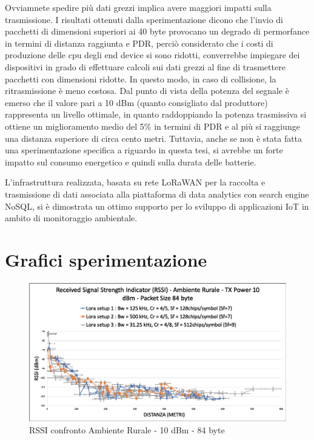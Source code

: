 \documentclass[12pt,a4paper,openright,twoside]{report}
\begin{document}
\begin{itemize}
Ovviamnete spedire pi\`u dati grezzi implica avere maggiori impatti sulla trasmissione. I risultati ottenuti dalla sperimentazione dicono che l'invio di pacchetti di dimensioni superiori ai 40 byte provocano un degrado di permorfance in termini di distanza raggiunta e PDR, perci\`o considerato che i costi di produzione delle cpu degli end device si sono ridotti, converrebbe impiegare dei dispositivi in grado di effettuare calcoli sui dati grezzi al fine di trasmettere pacchetti con dimensioni ridotte. 
In questo modo, in caso di collisione, la ritrasmissione \`e meno costosa.
Dal punto di vista della potenza del segnale \`e emerso che il valore pari a 10 dBm (quanto consigliato dal produttore) rappresenta un livello ottimale, in quanto raddoppiando la potenza trasmissiva si ottiene un miglioramento medio del 5\% in termini di PDR e al pi\`u si raggiunge una distanza superiore di circa cento metri. Tuttavia, anche se non \`e stata fatta una sperimentazione specifica a riguardo in questa tesi, si avrebbe un forte impatto sul consumo energetico e quindi sulla durata delle batterie.   
\end{itemize}
L'infrastruttura realizzata, basata su rete LoRaWAN per la raccolta e trasmissione di dati associata alla piattaforma di data analytics con search engine NoSQL, si \`e dimostrata un ottimo supporto per lo sviluppo di applicazioni IoT in ambito di monitoraggio ambientale.
\appendix
\chapter{Grafici sperimentazione}
\begin{figure}[h]                      
\begin{center} 
\includegraphics[width=\textwidth]{RSSI_confronto_AR-10dBm-84byte.png}
\caption[RSSI confronto Ambiente Rurale - 10 dBm - 84 byte]{RSSI confronto Ambiente Rurale - 10 dBm - 84 byte}\label{fig:prima}
\end{center}
\end{figure}
\end{document}
